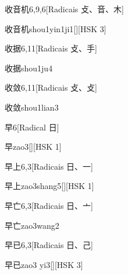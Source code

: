 \begin{entry}{收音机}{6,9,6}[Radicais ⽁、⾳、⽊]
  \begin{phonetics}{收音机}{shou1yin1ji1}[][HSK 3]
  \end{phonetics}
\end{entry}

\begin{entry}{收据}{6,11}[Radicais ⽁、⼿]
  \begin{phonetics}{收据}{shou1ju4}
  \end{phonetics}
\end{entry}

\begin{entry}{收敛}{6,11}[Radicais ⽁、⽁]
  \begin{phonetics}{收敛}{shou1lian3}
  \end{phonetics}
\end{entry}

\begin{entry}{早}{6}[Radical ⽇]
  \begin{phonetics}{早}{zao3}[][HSK 1]
  \end{phonetics}
\end{entry}

\begin{entry}{早上}{6,3}[Radicais ⽇、⼀]
  \begin{phonetics}{早上}{zao3shang5}[][HSK 1]
  \end{phonetics}
\end{entry}

\begin{entry}{早亡}{6,3}[Radicais ⽇、⼇]
  \begin{phonetics}{早亡}{zao3wang2}
  \end{phonetics}
\end{entry}

\begin{entry}{早已}{6,3}[Radicais ⽇、⼰]
  \begin{phonetics}{早已}{zao3 yi3}[][HSK 3]
  \end{phonetics}
\end{entry}

